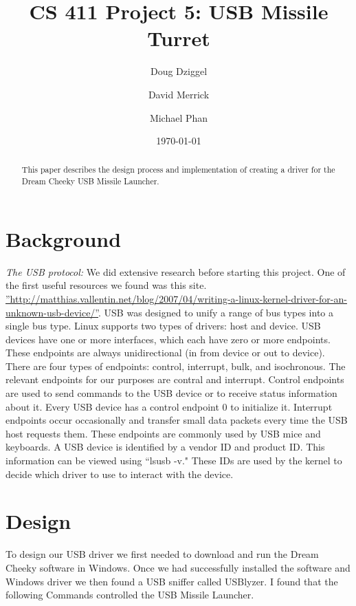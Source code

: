 \documentclass[letterpaper,10pt,titlepage]{article}
\def\titles{CS 411 Project 5: USB Missile Turret}
\def\dates{\today}
\begin{document}
\title{\titles}
\author{Doug Dziggel \and David Merrick \and Michael Phan}
\date{\dates}
\maketitle

\begin{abstract}
This paper describes the design process and implementation of creating a driver for the Dream Cheeky USB Missile Launcher.
\end{abstract}

\section{Background}


\emph{The USB protocol:} We did extensive research before starting this project. One of the first useful resources we found was this site. \hyperref[http://matthias.vallentin.net/blog/2007/04/writing-a-linux-kernel-driver-for-an-unknown-usb-device/]{''http://matthias.vallentin.net/blog/2007/04/writing-a-linux-kernel-driver-for-an-unknown-usb-device/''}. USB was designed to unify a range of bus types into a single bus type. Linux supports two types of drivers: host and device. USB devices have one or more interfaces, which each have zero or more endpoints. These endpoints are always unidirectional (in from device or out to device). There are four types of endpoints: control, interrupt, bulk, and isochronous. The relevant endpoints for our purposes are contral and interrupt. Control endpoints are used to send commands to the USB device or to receive status information about it. Every USB device has a control endpoint 0 to initialize it. Interrupt endpoints occur occasionally and transfer small data packets every time the USB host requests them. These endpoints are commonly used by USB mice and keyboards. A USB device is identified by a vendor ID and product ID. This information can be viewed using ``lsusb -v." These IDs are used by the kernel to decide which driver to use to interact with the device.

\newpage
\section{Design}

To design our USB driver we first needed to download and run the Dream Cheeky software in Windows. Once we had successfully installed the software and Windows driver we then found a USB sniffer called USBlyzer. I found that the following Commands controlled the USB Missile Launcher.
\end{document}
